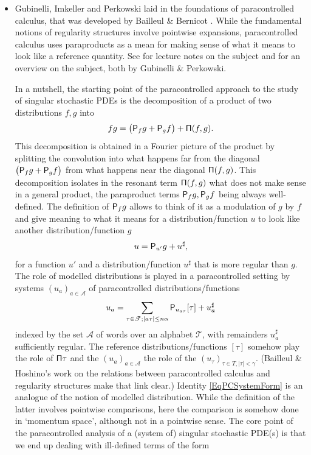 \documentclass[10pt, reqno]{amsart}
\numberwithin{subsection}{section}
\numberwithin{subsubsection}{subsection}
\numberwithin{equation}{section} %
\theoremstyle{mystyle}
\theoremstyle{mystyle2}
\theoremstyle{mystyle3}
\begin{document}
{\begin{itemize}
   \item Gubinelli, Imkeller and Perkowski laid in \cite{GIP} the foundations of paracontrolled calculus, that was developed by Bailleul \& Bernicot \cite{BB1, BB2, BB3}. While the fundamental notions of regularity structures involve pointwise expansions, paracontrolled calculus uses paraproducts as a mean for making sense of what it means to look like a reference quantity. See \cite{LNPCGP} for lecture notes on the subject and \cite{GPRoeckner} for an overview on the subject, both by Gubinelli \& Perkowski. 
   
   In a nutshell, the starting point of the paracontrolled approach to the study of singular stochastic PDEs is the decomposition of a product of two distributions $f,g$ into
   $$
   fg = \big({\sf P}_fg+{\sf P}_gf\big) + {\sf \Pi}(f,g).
   $$
   This decomposition is obtained in a Fourier picture of the product by splitting the convolution into what happens far from the diagonal $\big({\sf P}_fg+{\sf P}_gf\big)$ from what happens near the diagonal ${\sf \Pi}(f,g)$. This decomposition isolates in the resonant term ${\sf \Pi}(f,g)$ 
what does not make sense in a general product, the paraproduct terms ${\sf P}_fg, {\sf P}_gf$ being always well-defined. The definition of ${\sf P}_fg$ allows to think of it as a modulation of $g$ by $f$ and give meaning to what it means for a distribution/function $u$ to look like another distribution/function $g$
   $$
   u= {\sf P}_{u'}g + u^\sharp,
   $$
   for a function $u'$ and a distribution/function $u^\sharp$ that is more 
regular than $g$. The role of modelled distributions is played in a paracontrolled setting by systems $(u_a)_{a\in\mathscr{A}}$ of paracontrolled distributions/functions
   \begin{equation} \label{EqPCSystemForm}
   u_a = \sum_{\tau\in\mathscr{T};\vert a\tau\vert\leq n\alpha}{\sf P}_{u_{a\tau}}[\tau] + u_a^\sharp
   \end{equation}
   indexed by the set $\mathscr{A}$ of words over an alphabet $\mathscr{T}$, with remainders $u_a^\sharp$ sufficiently regular. The reference distributions/functions $[\tau]$ somehow play the role of ${\sf \Pi}\tau$ and 
the $(u_a)_{a\in\mathscr{A}}$ the role of the $(u_\tau)_{\tau\in T,\vert\tau\vert<\gamma}$. (Bailleul \& Hoshino's work \cite{BH1, BH2} on the relations between paracontrolled calculus and regularity structures make that link clear.) Identity \eqref{EqPCSystemForm} is an analogue of the notion of modelled distribution. While the definition of the latter involves pointwise comparisons, here the comparison is somehow done in `momentum space', although not in a pointwise sense. The core point of the paracontrolled analysis of a (system of) singular stochastic PDE(s) is that we end up dealing with ill-defined terms of the form

\end{itemize}}
\end{document}
